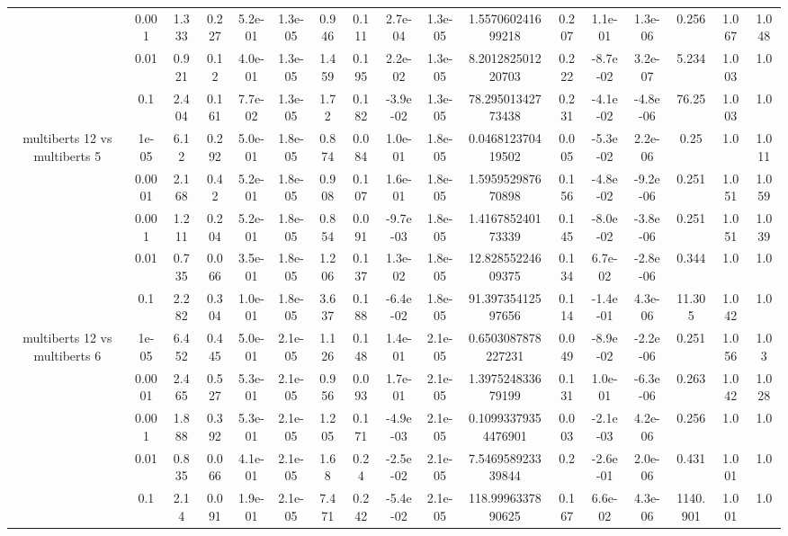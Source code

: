 \begin{tabular}{|c|c|c|c|c|c|c|c|c|c|c|c|c|c|c|c|c|}
 & 0.001 & 1.333 & 0.227 & 5.2e-01 & 1.3e-05 & 0.946 & 0.111 & 2.7e-04 & 1.3e-05 & 1.557060241699218 & 0.207 & 1.1e-01 & 1.3e-06 & 0.256 & 1.067 & 1.048 \\
 & 0.01 & 0.921 & 0.12 & 4.0e-01 & 1.3e-05 & 1.459 & 0.195 & 2.2e-02 & 1.3e-05 & 8.201282501220703 & 0.222 & -8.7e-02 & 3.2e-07 & 5.234 & 1.003 & 1.0 \\
 & 0.1 & 2.404 & 0.161 & 7.7e-02 & 1.3e-05 & 1.72 & 0.182 & -3.9e-02 & 1.3e-05 & 78.29501342773438 & 0.231 & -4.1e-02 & -4.8e-06 & 76.25 & 1.003 & 1.0 \\
\hline
\multirow{5}{*}{multiberts 12 vs multiberts 5} & 1e-05 & 6.12 & 0.292 & 5.0e-01 & 1.8e-05 & 0.874 & 0.084 & 1.0e-01 & 1.8e-05 & 0.046812370419502 & 0.005 & -5.3e-02 & 2.2e-06 & 0.25 & 1.0 & 1.011 \\
 & 0.0001 & 2.168 & 0.42 & 5.2e-01 & 1.8e-05 & 0.908 & 0.107 & 1.6e-01 & 1.8e-05 & 1.595952987670898 & 0.156 & -4.8e-02 & -9.2e-06 & 0.251 & 1.051 & 1.059 \\
 & 0.001 & 1.211 & 0.204 & 5.2e-01 & 1.8e-05 & 0.854 & 0.091 & -9.7e-03 & 1.8e-05 & 1.416785240173339 & 0.145 & -8.0e-02 & -3.8e-06 & 0.251 & 1.051 & 1.039 \\
 & 0.01 & 0.735 & 0.066 & 3.5e-01 & 1.8e-05 & 1.206 & 0.137 & 1.3e-02 & 1.8e-05 & 12.82855224609375 & 0.134 & 6.7e-02 & -2.8e-06 & 0.344 & 1.0 & 1.0 \\
 & 0.1 & 2.282 & 0.304 & 1.0e-01 & 1.8e-05 & 3.637 & 0.188 & -6.4e-02 & 1.8e-05 & 91.39735412597656 & 0.114 & -1.4e-01 & 4.3e-06 & 11.305 & 1.042 & 1.0 \\
\hline
\multirow{5}{*}{multiberts 12 vs multiberts 6} & 1e-05 & 6.452 & 0.445 & 5.0e-01 & 2.1e-05 & 1.126 & 0.148 & 1.4e-01 & 2.1e-05 & 0.6503087878227231 & 0.049 & -8.9e-02 & -2.2e-06 & 0.251 & 1.056 & 1.03 \\
 & 0.0001 & 2.465 & 0.527 & 5.3e-01 & 2.1e-05 & 0.956 & 0.093 & 1.7e-01 & 2.1e-05 & 1.397524833679199 & 0.131 & 1.0e-01 & -6.3e-06 & 0.263 & 1.042 & 1.028 \\
 & 0.001 & 1.888 & 0.392 & 5.3e-01 & 2.1e-05 & 1.205 & 0.171 & -4.9e-03 & 2.1e-05 & 0.10993379354476901 & 0.003 & -2.1e-03 & 4.2e-06 & 0.256 & 1.0 & 1.0 \\
 & 0.01 & 0.835 & 0.066 & 4.1e-01 & 2.1e-05 & 1.68 & 0.24 & -2.5e-02 & 2.1e-05 & 7.546958923339844 & 0.2 & -2.6e-01 & 2.0e-06 & 0.431 & 1.001 & 1.0 \\
 & 0.1 & 2.14 & 0.091 & 1.9e-01 & 2.1e-05 & 7.471 & 0.242 & -5.4e-02 & 2.1e-05 & 118.9996337890625 & 0.167 & 6.6e-02 & 4.3e-06 & 1140.901 & 1.001 & 1.0 \\

\end{tabular}

